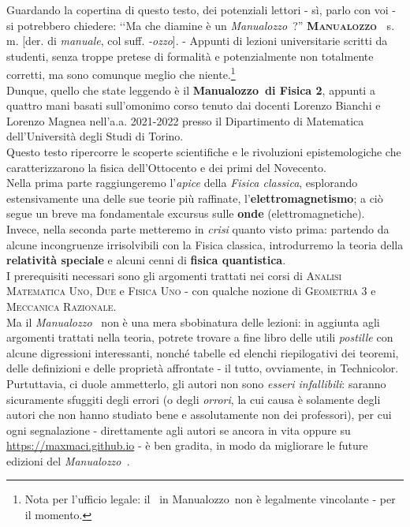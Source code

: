 \noindent Guardando la copertina di questo testo, dei potenziali lettori - sì, parlo con voi - si potrebbero chiedere: ‘‘Ma che diamine è un \textit{Manualozzo\texttrademark\ }?''
\vspace{3mm}
\lettrine[findent=1pt, nindent=0pt]{\textbf{M}}{\textbf{anualozzo\texttrademark\ }} s. m. [der. di \textit{manuale}, col suff. \textit{-ozzo}]. - Appunti di lezioni universitarie scritti da studenti, senza troppe pretese di formalità e potenzialmente non totalmente corretti, ma sono comunque meglio che niente.\footnote{Nota per l'ufficio legale: il \texttrademark\ in Manualozzo\texttrademark\ non è legalmente vincolante - per il momento.}
\vspace{3mm}\\
Dunque, quello che state leggendo è il \textbf{Manualozzo\texttrademark\  di Fisica 2}, appunti a quattro mani basati sull'omonimo corso tenuto dai docenti Lorenzo Bianchi e Lorenzo Magnea nell'a.a. 2021-2022 presso il Dipartimento di Matematica dell'Università degli Studi di Torino.\\
Questo testo ripercorre le scoperte scientifiche e le rivoluzioni epistemologiche che caratterizzarono la fisica dell'Ottocento e dei primi del Novecento. \\
Nella prima parte raggiungeremo l'\textit{apice} della \textit{Fisica classica}, esplorando estensivamente una delle sue teorie più raffinate, l'\textbf{elettromagnetismo}; a ciò segue un breve ma fondamentale excursus sulle \textbf{onde} (elettromagnetiche).\\
Invece, nella seconda parte metteremo in \textit{crisi} quanto visto prima: partendo da alcune incongruenze irrisolvibili con la Fisica classica, introdurremo la teoria della \textbf{relatività speciale} e alcuni cenni di \textbf{fisica quantistica}.\\
I prerequisiti necessari sono gli argomenti trattati nei corsi di \textsc{Analisi Matematica Uno}, \textsc{Due} e \textsc{Fisica Uno} - con qualche nozione di \textsc{Geometria 3} e \textsc{Meccanica Razionale}.\\
Ma il \textit{Manualozzo\texttrademark\ } non è una mera sbobinatura delle lezioni: in aggiunta agli argomenti trattati nella teoria, potrete trovare a fine libro delle utili \textit{postille} con alcune digressioni interessanti, nonché tabelle ed elenchi riepilogativi dei teoremi, delle definizioni e delle proprietà affrontate - il tutto, ovviamente, in Technicolor\texttrademark. %
Purtuttavia, ci duole ammetterlo, gli autori non sono \textit{esseri infallibili}: saranno sicuramente sfuggiti degli errori (o degli \textit{orrori}, la cui causa è solamente degli autori che non hanno studiato bene e assolutamente non dei professori), per cui ogni segnalazione - direttamente agli autori se ancora in vita oppure su \textcolor{redill}{\url{https://maxmaci.github.io}} - è ben gradita, in modo da migliorare le future edizioni del \textit{Manualozzo\texttrademark\ }.

